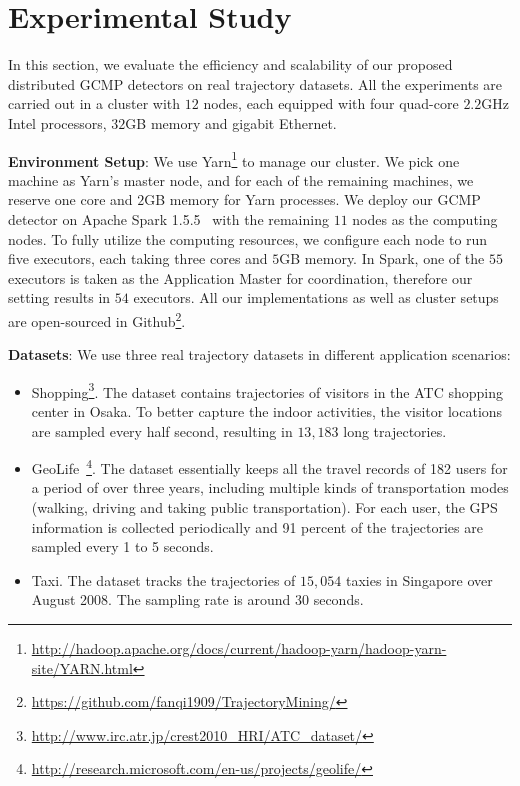 \section{Experimental Study}
\label{sec:exp}
In this section, we evaluate the efficiency and scalability of our proposed distributed GCMP detectors on real trajectory datasets. All the experiments are carried out in a cluster with $12$ nodes, each equipped with four quad-core $2.2$GHz Intel processors, $32$GB memory and gigabit Ethernet. 

\textbf{Environment Setup}: We use Yarn\footnote{\url{http://hadoop.apache.org/docs/current/hadoop-yarn/hadoop-yarn-site/YARN.html}} to manage our cluster. We pick one machine as Yarn's master node, and for each of the remaining machines, we reserve one core and $2$GB memory for Yarn processes. We deploy our GCMP detector on Apache Spark 1.5.5~\cite{zaharia2012resilient} with the remaining $11$ nodes as the computing nodes.
To fully utilize the computing resources, we configure each node to run five executors, each taking three cores and $5$GB memory. In Spark, one of the $55$ executors is taken as the Application Master for coordination, therefore our setting results in $54$ executors.
All our implementations as well as cluster setups are open-sourced in Github\footnote{\url{https://github.com/fanqi1909/TrajectoryMining/}}.

\textbf{Datasets}: We use three real trajectory datasets in different application scenarios:
\begin{itemize}
\item{Shopping}\footnote{\url{http://www.irc.atr.jp/crest2010_HRI/ATC_dataset/}}. The dataset contains
  trajectories of visitors in the ATC shopping center in Osaka. To better capture the indoor activities, the visitor locations are sampled every half second, resulting in $13,183$ long trajectories. 
\item{GeoLife}~\footnote{\url{http://research.microsoft.com/en-us/projects/geolife/}}. The dataset essentially keeps all the travel records of 182 users for a period
of over three years, including multiple kinds of transportation modes (walking, driving and taking public
transportation). For each user, the GPS information is collected periodically and 91 percent of the trajectories
are sampled every 1 to 5 seconds.
\item{Taxi}. The dataset tracks the trajectories of $15,054$ taxies in Singapore over August 2008. The sampling
rate is around 30 seconds. 
\end{itemize}


